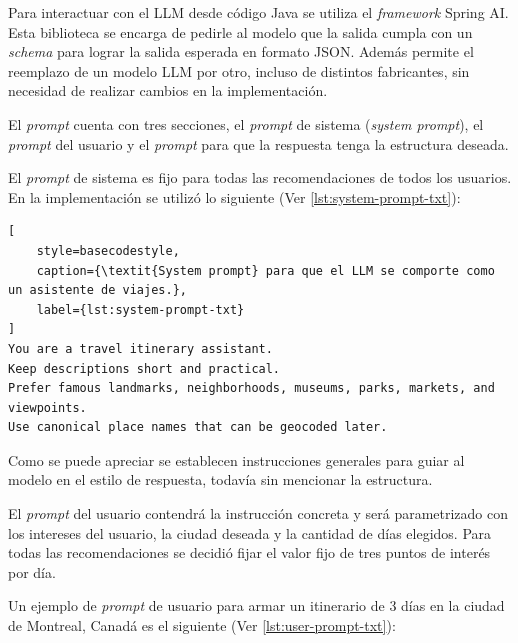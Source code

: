 Para interactuar con el LLM desde código Java se utiliza el \textit{framework} Spring AI\@.
Esta biblioteca se encarga de pedirle al modelo que la salida cumpla con un \textit{schema} para lograr la salida
esperada en formato JSON\@.
Además permite el reemplazo de un modelo LLM por otro, incluso de distintos fabricantes, sin necesidad de realizar
cambios en la implementación.

El \textit{prompt} cuenta con tres secciones, el \textit{prompt} de sistema (\textit{system prompt}), el \textit{prompt}
del usuario y el \textit{prompt} para que la respuesta tenga la estructura deseada.

El \textit{prompt} de sistema es fijo para todas las recomendaciones de todos los usuarios.
En la implementación se utilizó lo siguiente (Ver \autoref{lst:system-prompt-txt}):

\begin{lstlisting}[
    style=basecodestyle,
    caption={\textit{System prompt} para que el LLM se comporte como un asistente de viajes.},
    label={lst:system-prompt-txt}
]
You are a travel itinerary assistant.
Keep descriptions short and practical.
Prefer famous landmarks, neighborhoods, museums, parks, markets, and viewpoints.
Use canonical place names that can be geocoded later.
\end{lstlisting}

Como se puede apreciar se establecen instrucciones generales para guiar al modelo en el estilo de respuesta, todavía
sin mencionar la estructura.

El \textit{prompt} del usuario contendrá la instrucción concreta y será parametrizado con los intereses del usuario,
la ciudad deseada y la cantidad de días elegidos.
Para todas las recomendaciones se decidió fijar el valor fijo de tres puntos de interés por día.

Un ejemplo de \textit{prompt} de usuario para armar un itinerario de 3 días en la ciudad de Montreal, Canadá es el
siguiente (Ver \autoref{lst:user-prompt-txt}):

